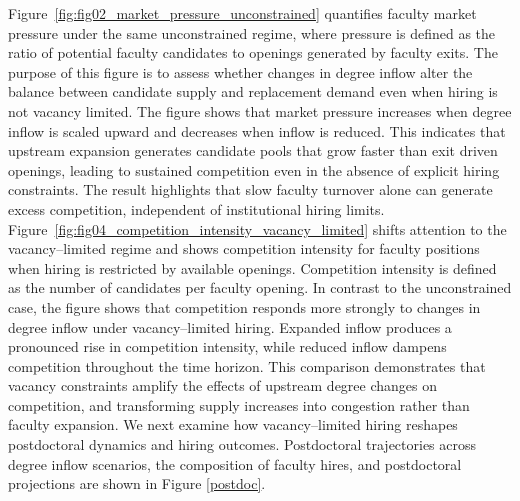 \documentclass[3p]{elsarticle}%
\theoremstyle{definition}
\begin{document}
\noindent Figure~\ref{fig:fig02_market_pressure_unconstrained} quantifies faculty market pressure under the same unconstrained regime, where pressure is defined as the ratio of potential faculty candidates to openings generated by faculty exits. The purpose of this figure is to assess whether changes in degree inflow alter the balance between candidate supply and replacement demand even when hiring is not vacancy limited. The figure shows that market pressure increases when degree inflow is scaled upward and decreases when inflow is reduced. This indicates that upstream expansion generates candidate pools that grow faster than exit driven openings, leading to sustained competition even in the absence of explicit hiring constraints. The result highlights that slow faculty turnover alone can generate excess competition, independent of institutional hiring limits. Figure~\ref{fig:fig04_competition_intensity_vacancy_limited} shifts attention to the vacancy--limited regime and shows competition intensity for faculty positions when hiring is restricted by available openings. Competition intensity is defined as the number of candidates per faculty opening. In contrast to the unconstrained case, the figure shows that competition responds more strongly to changes in degree inflow under vacancy--limited hiring. Expanded inflow produces a pronounced rise in competition intensity, while reduced inflow dampens competition throughout the time horizon. This comparison demonstrates that vacancy constraints amplify the effects of upstream degree changes on competition, and transforming supply increases into congestion rather than faculty expansion. We next examine how vacancy--limited hiring reshapes postdoctoral dynamics and hiring outcomes. Postdoctoral trajectories across degree inflow scenarios, the composition of faculty hires, and postdoctoral projections are shown in Figure \ref{postdoc}.
\\\\
\end{document}
